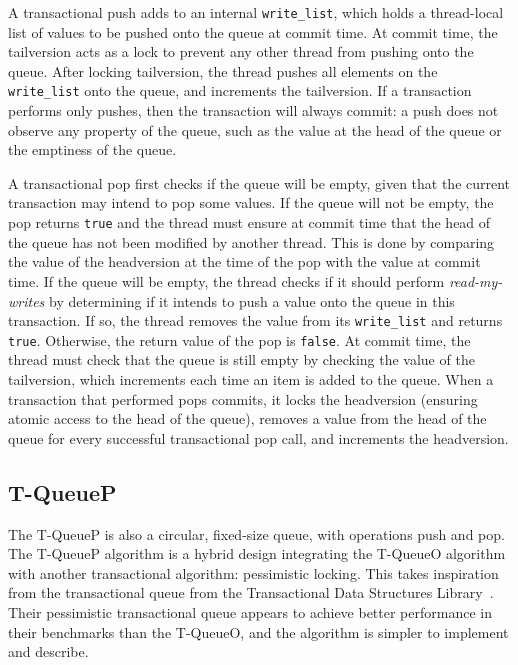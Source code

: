 A transactional push adds to an internal \texttt{write\_list}, which holds a thread-local list of values to be pushed onto the queue at commit time. At commit time, the tailversion acts as a lock to prevent any other thread from pushing onto the queue. After locking tailversion, the thread pushes all elements on the \texttt{write\_list} onto the queue, and increments the tailversion.
If a transaction performs only pushes, then the transaction will always commit: a push does not observe any property of the queue, such as the value at the head of the queue or the emptiness of the queue. 

A transactional pop first checks if the queue will be empty, given that the current transaction may intend to pop some values. If the queue will not be empty, the pop returns \texttt{true} and the thread must ensure at commit time that the head of the queue has not been modified by another thread. This is done by comparing the value of the headversion at the time of the pop with the value at commit time. 
If the queue will be empty, the thread checks if it should perform \emph{read-my-writes} by determining if it intends to push a value onto the queue in this transaction. If so, the thread removes the value from its \texttt{write\_list} and returns \texttt{true}. Otherwise, the return value of the pop is \texttt{false}. At commit time, the thread must check that the queue is still empty by checking the value of the tailversion, which increments each time an item is added to the queue.
When a transaction that performed pops commits, it locks the headversion (ensuring atomic access to the head of the queue), removes a value from the head of the queue for every successful transactional pop call, and increments the headversion.


\subsection{T-QueueP}
The T-QueueP is also a circular, fixed-size queue, with operations push and pop. The T-QueueP algorithm is a hybrid design integrating the T-QueueO algorithm with another transactional algorithm: pessimistic locking. This takes inspiration from the transactional queue from the Transactional Data Structures Library~\cite{tdsl}. Their pessimistic transactional queue appears to achieve better performance in their benchmarks than the T-QueueO, and the algorithm is simpler to implement and describe. 

